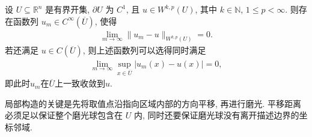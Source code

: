 \documentclass[../../main.tex]{subfiles}
\begin{document}
\begin{theorem}[直到边界光滑的函数整体逼近定理]\label{theorem:ch05-直到边界光滑的函数整体逼近定理}
设 $U\subseteq\mathbb{R}^{n}$ 是有界开集, $\partial U$ 为 $C^{1}$, 且 $u\in W^{k,p}(U)$, 其中 $k\in\mathbb{N}$, $1\leqslant p<\infty$. 则存在函数列 $u_m\in C^{\infty}(\overline{U})$, 使得
\begin{align*}
\lim\limits_{m\to\infty}\|u_m-u\|_{W^{k,p}(U)}=0.
\end{align*}
若还满足 $u\in C(\overline{U})$, 则上述函数列可以选得同时满足
\begin{align*}
\lim\limits_{m\to\infty}\sup\limits_{x\in\overline{U}}|u_m(x)-u(x)|=0,
\end{align*}
即此时$u_m$在$\overline{U}$上一致收敛到$u$.
\end{theorem}
\begin{remark}
局部构造的关键是先将取值点沿指向区域内部的方向平移, 再进行磨光. 平移距离必须足以保证整个磨光球包含在 $U$ 内, 同时还要保证磨光球没有离开描述边界的坐标邻域.
\end{remark}
\end{document}

